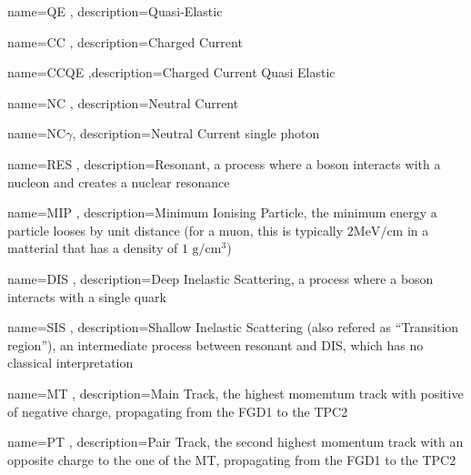 


 {name=QE , description={Quasi-Elastic}}

 {name=CC , description={Charged Current}}

 {name=CCQE ,description={Charged Current Quasi
Elastic}}

 {name=NC , description={Neutral Current}}

 {name=NC$\gamma$, description={Neutral Current
single photon}}

 {name=RES , description={Resonant, a process
where a boson interacts with a nucleon and creates a nuclear
resonance}}

 {name=MIP , description={Minimum Ionising
Particle, the minimum energy a particle looses by unit distance (for a
muon, this is typically $2 \text{MeV}/\text{cm}$ in a matterial that
has a density of $1 \text{~g}/\text{cm}^3$)}}

 {name=DIS , description={Deep Inelastic
Scattering, a process where a boson interacts with a single quark}}

 {name=SIS , description={Shallow Inelastic
Scattering (also refered as ``Transition region''), an intermediate
process between resonant and DIS, which has no classical
interpretation}}

 {name=MT , description={Main Track, the highest
momemtum track with positive of negative charge, propagating from the
FGD1 to the TPC2}}

 {name=PT , description={Pair Track, the second
highest momentum track with an opposite charge to the one of the MT,
propagating from the FGD1 to the TPC2}}

